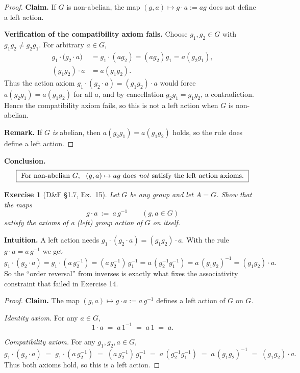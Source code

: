 \documentclass[12pt]{article}
\newtheorem{exercise}[theorem]{Exercise}
\theoremstyle{definition}
\begin{document}
\dotfill

\begin{proof}
\noindent\textbf{Claim.} If $G$ is non-abelian, the map $(g,a)\mapsto g\cdot a:=ag$ does not define a left action.

\smallskip
\noindent\textbf{Verification of the compatibility axiom fails.}
Choose $g_1,g_2\in G$ with $g_1g_2\ne g_2g_1$.
For arbitrary $a\in G$,
\[
\begin{aligned}
g_1\cdot\bigl(g_2\cdot a\bigr)
  &= g_1\cdot(ag_2)
   = (ag_2)g_1
   = a(g_2g_1),\\
(g_1g_2)\cdot a
  &= a(g_1g_2).
\end{aligned}
\]
Thus the action axiom $g_1\cdot(g_2\cdot a)=(g_1g_2)\cdot a$ would force
$a(g_2g_1)=a(g_1g_2)$ for all $a$, and by cancellation $g_2g_1=g_1g_2$, a contradiction.
Hence the compatibility axiom fails, so this is not a left action when $G$ is non-abelian.

\smallskip
\noindent\textbf{Remark.} If $G$ \emph{is} abelian, then $a(g_2g_1)=a(g_1g_2)$ holds, so the rule does define a left action.
\end{proof}

\noindent\textbf{Conclusion.}
\[
\boxed{\ \text{For non-abelian }G,\ \ (g,a)\mapsto ag\ \text{does \emph{not} satisfy the left action axioms.}\ }
\]

\newpage

\begin{exercise}[D\&F §1.7, Ex.~15]
Let $G$ be any group and let $A=G$. Show that the maps
\[
g\cdot a\ :=\ a\,g^{-1}\qquad(g,a\in G)
\]
satisfy the axioms of a (left) group action of $G$ on itself.
\end{exercise}

\dotfill

\noindent\textbf{Intuition.}
A left action needs $g_1\cdot(g_2\cdot a)=(g_1g_2)\cdot a$.
With the rule $g\cdot a=a\,g^{-1}$ we get
\[
g_1\cdot(g_2\cdot a)=g_1\cdot(a\,g_2^{-1})=(a\,g_2^{-1})\,g_1^{-1}
= a\,(g_2^{-1}g_1^{-1})=a\,(g_1g_2)^{-1}=(g_1g_2)\cdot a.
\]
So the “order reversal” from inverses is exactly what fixes the associativity
constraint that failed in Exercise 14.

\dotfill

\begin{proof}
\noindent\textbf{Claim.} The map $(g,a)\mapsto g\cdot a:=a\,g^{-1}$ defines a left action of $G$ on $G$.

\smallskip
\noindent\emph{Identity axiom.}
For any $a\in G$,
\[
1\cdot a \;=\; a\,1^{-1}\;=\;a\,1\;=\;a.
\]

\smallskip
\noindent\emph{Compatibility axiom.}
For any $g_1,g_2,a\in G$,
\[
g_1\cdot(g_2\cdot a)
  \;=\; g_1\cdot(a\,g_2^{-1})
  \;=\; (a\,g_2^{-1})\,g_1^{-1}
  \;=\; a\,(g_2^{-1}g_1^{-1})
  \;=\; a\,(g_1g_2)^{-1}
  \;=\; (g_1g_2)\cdot a.
\]
Thus both axioms hold, so this is a left action.
\end{proof}
\end{document}
